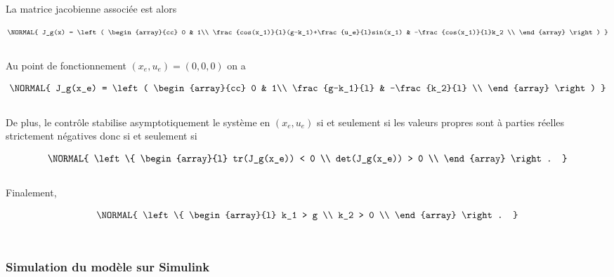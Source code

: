 \documentclass[11pt,french]{article} %
\begin{document}
La matrice jacobienne associée est alors 

\begin{equation}
	\NORMAL{
		J_g(x) = 
		\left(
		\begin{array}{cc}
			0 & 1\\
			\frac{cos(x_1)}{l}(g-k_1)+\frac{u_e}{l}sin(x_1) & -\frac{cos(x_1)}{l}k_2 \\
    \end{array}
  \right)
	}
\end{equation}\\

Au point de fonctionnement $(x_e,u_e) = (0,0,0)$ on a 

\begin{equation}
	\NORMAL{
		J_g(x_e) = 
		\left(
		\begin{array}{cc}
			0 & 1\\
			\frac{g-k_1}{l} & -\frac{k_2}{l} \\
    \end{array}
  \right)
	}
\end{equation}\\

De plus, le contrôle stabilise asymptotiquement le système en $(x_e,u_e)$ si et seulement si les valeurs propres sont à parties réelles strictement négatives donc si et seulement si

\begin{equation}
	\NORMAL{
  \left\{
    \begin{array}{l}
			tr(J_g(x_e)) < 0 \\
			det(J_g(x_e)) > 0 \\
    \end{array}
  \right.
	}
\end{equation}\\

Finalement,

\begin{equation} \label{eq:k12}
	\NORMAL{
  \left\{
    \begin{array}{l}
			k_1 > g \\
			k_2 > 0 \\
    \end{array}
  \right.
	}
\end{equation}\\

\subsubsection{Simulation du modèle sur Simulink} 
\end{document}
